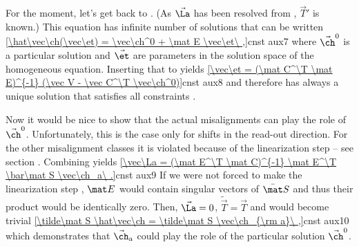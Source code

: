 For the moment, let's get back to . (As $\vec\La$ has been resolved from , $\vec T'$ is known.) This equation has infinite number of solutions that can be written
\eqref{\hat\vec\ch(\vec\et) = \vec\ch^0 + \mat E \vec\et\ ,}{cnst aux7}
where $\vec\ch^0$ is a particular solution and $\vec\et$ are parameters in the solution space of the homogeneous equation. Inserting that to  yields
\eqref{\vec\et = (\mat C^\T \mat E)^{-1} (\vec V - \vec C^\T \vec\ch^0)}{cnst aux8}
and therefore  has always a unique solution that satisfies all constraints .

Now it would be nice to show that the actual misalignments can play the role of $\vec\ch^0$. Unfortunately, this is the case only for shifts in the read-out direction. For the other misalignment classes it is violated because of the linearization step  -- see section . Combining  yields
\eqref{\vec\La = (\mat E^\T \mat C)^{-1} \mat E^\T \bar\mat S \vec\ch_a\ .}{cnst aux9}
If we were not forced to make the linearization step , $\mat E$ would contain singular vectors of $\bar\mat S$ and thus their product would be identically zero. Then, $\vec\La = 0$, $\tilde\vec T = \vec T$ and  would become trivial
\eqref{\tilde\mat S \hat\vec\ch = \tilde\mat S \vec\ch_{\rm a}\ ,}{cnst aux10}
which demonstrates that $\vec\ch_{\rm a}$ could play the role of the particular solution $\vec\ch^0$.


